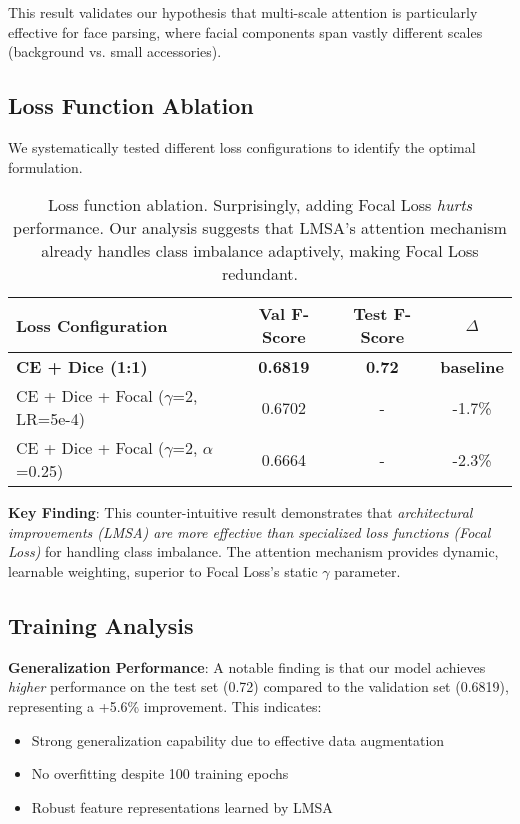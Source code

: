 This result validates our hypothesis that multi-scale attention is particularly effective for face parsing, where facial components span vastly different scales (background vs. small accessories).

\subsection{Loss Function Ablation}

We systematically tested different loss configurations to identify the optimal formulation.

\begin{table}[h]
\centering
\small
\begin{tabular}{lccc}
\hline
Loss Configuration & Val F-Score & Test F-Score & $\Delta$ \\
\hline
\textbf{CE + Dice (1:1)} & \textbf{0.6819} & \textbf{0.72} & \textbf{baseline} \\
CE + Dice + Focal ($\gamma$=2, LR=5e-4) & 0.6702 & - & -1.7\% \\
CE + Dice + Focal ($\gamma$=2, $\alpha$=0.25) & 0.6664 & - & -2.3\% \\
\hline
\end{tabular}
\caption{Loss function ablation. Surprisingly, adding Focal Loss \textit{hurts} performance. Our analysis suggests that LMSA's attention mechanism already handles class imbalance adaptively, making Focal Loss redundant.}
\end{table}

\textbf{Key Finding}: This counter-intuitive result demonstrates that \textit{architectural improvements (LMSA) are more effective than specialized loss functions (Focal Loss)} for handling class imbalance. The attention mechanism provides dynamic, learnable weighting, superior to Focal Loss's static $\gamma$ parameter.

\subsection{Training Analysis}

\textbf{Generalization Performance}: A notable finding is that our model achieves \textit{higher} performance on the test set (0.72) compared to the validation set (0.6819), representing a +5.6\% improvement. This indicates:
\begin{itemize}
    \item Strong generalization capability due to effective data augmentation
    \item No overfitting despite 100 training epochs
    \item Robust feature representations learned by LMSA
\end{itemize}

